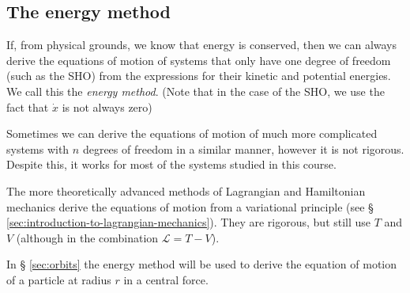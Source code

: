 \documentclass[a4paper]{article}
\begin{document}
\subsection{The energy method}\label{sec:the-energy-method}
If, from physical grounds, we know that energy is conserved, then we can always derive the equations of motion of systems that only have one degree of freedom (such as the SHO) from the expressions for their kinetic and potential energies. We call this the \emph{energy method}. (Note that in the case of the SHO, we use the fact that $\dot{x}$ is not always zero)

Sometimes we can derive the equations of motion of much more complicated systems with $n$ degrees of freedom in a similar manner, however it is not rigorous. Despite this, it works for most of the systems studied in this course.

The more theoretically advanced methods of Lagrangian and Hamiltonian mechanics derive the equations of motion from a variational principle (see § \ref{sec:introduction-to-lagrangian-mechanics}). They are rigorous, but still use $T$ and $V$ (although in the combination $\mathcal{L} = T - V$).

In § \ref{sec:orbits} the energy method will be used to derive the equation of motion of a particle at radius $r$ in a central force.
\end{document}
